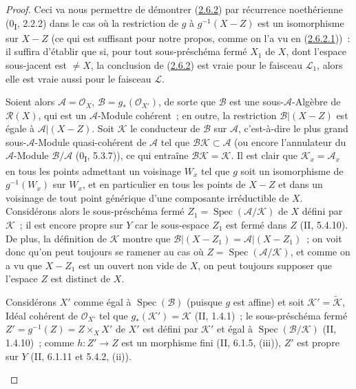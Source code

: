 \begin{proof}
Ceci va nous permettre de démontrer
(\hyperref[III.2.6.2-fr]{2.6.2}) par récurrence noethérienne
(0\textsubscript{I}, 2.2.2) dans le cas où la restriction de $g$ à
$g^{-1}(X-Z)$ est un isomorphisme sur $X-Z$ (ce qui est suffisant pour
notre propos, comme on l'a vu en
(\hyperref[III.2.6.2.1-fr]{2.6.2.1}))~: il suffira d'établir que si, pour
tout sous-préschéma fermé $X_1$ de $X$, dont l'espace sous-jacent est
$\neq X$, la conclusion de (\hyperref[III.2.6.2-fr]{2.6.2}) est vraie
pour le faisceau $\mathcal L_1$, alors elle est vraie aussi pour le
faisceau $\mathcal L$.

\begin{env}[2.6.2.4]
\label{III.2.6.2.4-fr}
Soient alors $\mathcal A=\mathcal O_X$, $\mathcal B=g_*(\mathcal O_{X'})$,
de sorte que $\mathcal B$ est une sous-$\mathcal A$-Algèbre de
$\mathcal R(X)$, qui est un $\mathcal A$-Module cohérent~; en outre, la
restriction $\mathcal B|(X-Z)$ est égale à $\mathcal A|(X-Z)$. Soit
$\mathcal K$ le conducteur de $\mathcal B$ sur $\mathcal A$, c'est-à-dire
le plus grand sous-$\mathcal A$-Module quasi-cohérent de $\mathcal A$ tel
que $\mathcal B\mathcal K\subset\mathcal A$ (ou encore l'annulateur du
$\mathcal A$-Module $\mathcal B/\mathcal A$
(0\textsubscript{I}, 5.3.7)), ce qui entraîne
$\mathcal B\mathcal K=\mathcal K$. Il est clair que
$\mathcal K_x=\mathcal A_x$ en tous les points admettant un voisinage
$W_x$ tel que $g$ soit un isomorphisme de $g^{-1}(W_x)$ sur $W_x$, et en
particulier en tous les points de $X-Z$ et dans un voisinage de tout
point générique d'une composante irréductible de $X$. Considérons alors
le sous-préschéma fermé $Z_1=\operatorname{Spec}(\mathcal A/\mathcal K)$
de $X$ défini par $\mathcal K$~; il est encore propre sur $Y$ car le
sous-espace $Z_1$ est fermé dans $Z$ (II, 5.4.10). De plus, la définition
de $\mathcal K$ montre que
$\mathcal B|(X-Z_1)=\mathcal A|(X-Z_1)$~; on voit donc qu'on peut toujours
se ramener au cas où
$Z=\operatorname{Spec}(\mathcal A/\mathcal K)$, et comme on a vu que
$X-Z_1$ est un ouvert non vide de $X$, on peut toujours supposer que
l'espace $Z$ est distinct de $X$.
\end{env}

\begin{env}[2.6.2.5]
\label{III.2.6.2.5-fr}
Considérons $X'$ comme égal à $\operatorname{Spec}(\mathcal B)$ (puisque
$g$ est affine) et soit $\mathcal K'=\widetilde{\mathcal K}$, Idéal
cohérent de $\mathcal O_{X'}$ tel que $g_*(\mathcal K')=\mathcal K$
(II, 1.4.1)~; le sous-préschéma fermé
$Z'=g^{-1}(Z)=Z\times_X X'$ de $X'$ est défini par $\mathcal K'$ et égal
à $\operatorname{Spec}(\mathcal B/\mathcal K)$ (II, 1.4.10)~; comme
$h:Z'\to Z$ est un morphisme fini (II, 6.1.5, (iii)), $Z'$ est propre
sur $Y$ (II, 6.1.11 et 5.4.2, (ii)).


\end{env}
\end{proof}
